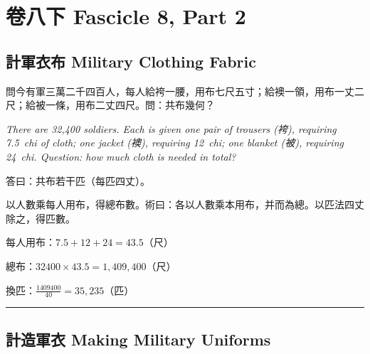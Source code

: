 \documentclass[11pt,a4paper]{article}
\newcommand{\longline}{\noindent\rule{\textwidth}{0.4pt}}
\begin{document}
\section{卷八下 \quad Fascicle 8, Part 2}
\label{sec:fasc8b}

\begin{center}
\end{center}

\medskip

\subsection{計軍衣布 \quad Military Clothing Fabric}

\begin{problem}
問今有軍三萬二千四百人，每人給袴一腰，用布七尺五寸；給襖一領，用布一丈二尺；給被一條，用布二丈四尺。問：共布幾何？

\textit{There are 32{,}400 soldiers. Each is given one pair of trousers (袴), requiring 7.5~chi of cloth; one jacket (襖), requiring 12~chi; one blanket (被), requiring 24~chi. Question: how much cloth is needed in total?}
\end{problem}

\begin{answer}
答曰：共布若干匹（每匹四丈）。
\end{answer}

\begin{method}
以人數乘每人用布，得總布數。術曰：各以人數乘本用布，并而為總。以匹法四丈除之，得匹數。
\end{method}

\begin{working}
每人用布：$7.5 + 12 + 24 = 43.5$（尺）

總布：$32400 \times 43.5 = 1{,}409{,}400$（尺）

換匹：$\displaystyle\frac{1409400}{40} = 35{,}235$（匹）
\end{working}

\vspace{0.5em}
\longline

\subsection{計造軍衣 \quad Making Military Uniforms}
\end{document}
